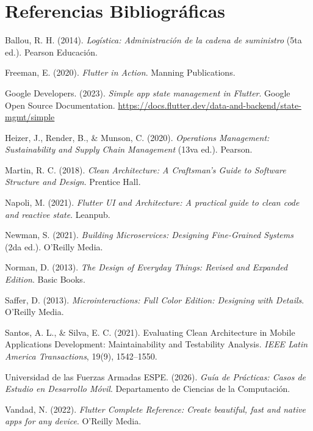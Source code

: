 \documentclass[12pt,a4paper]{article}
\begin{document}
\section{Referencias Bibliográficas}
\begin{description}
    \item Ballou, R. H. (2014). \textit{Logística: Administración de la cadena de suministro} (5ta ed.). Pearson Educación.
    \item Freeman, E. (2020). \textit{Flutter in Action}. Manning Publications.
    \item Google Developers. (2023). \textit{Simple app state management in Flutter}. Google Open Source Documentation. \url{https://docs.flutter.dev/data-and-backend/state-mgmt/simple}
    \item Heizer, J., Render, B., \& Munson, C. (2020). \textit{Operations Management: Sustainability and Supply Chain Management} (13va ed.). Pearson.
    \item Martin, R. C. (2018). \textit{Clean Architecture: A Craftsman's Guide to Software Structure and Design}. Prentice Hall.
    \item Napoli, M. (2021). \textit{Flutter UI and Architecture: A practical guide to clean code and reactive state}. Leanpub.
    \item Newman, S. (2021). \textit{Building Microservices: Designing Fine-Grained Systems} (2da ed.). O'Reilly Media.
    \item Norman, D. (2013). \textit{The Design of Everyday Things: Revised and Expanded Edition}. Basic Books.
    \item Saffer, D. (2013). \textit{Microinteractions: Full Color Edition: Designing with Details}. O'Reilly Media.
    \item Santos, A. L., \& Silva, E. C. (2021). Evaluating Clean Architecture in Mobile Applications Development: Maintainability and Testability Analysis. \textit{IEEE Latin America Transactions}, 19(9), 1542--1550.
    \item Universidad de las Fuerzas Armadas ESPE. (2026). \textit{Guía de Prácticas: Casos de Estudio en Desarrollo Móvil}. Departamento de Ciencias de la Computación.
    \item Vandad, N. (2022). \textit{Flutter Complete Reference: Create beautiful, fast and native apps for any device}. O'Reilly Media.
\end{description}
\end{document}
